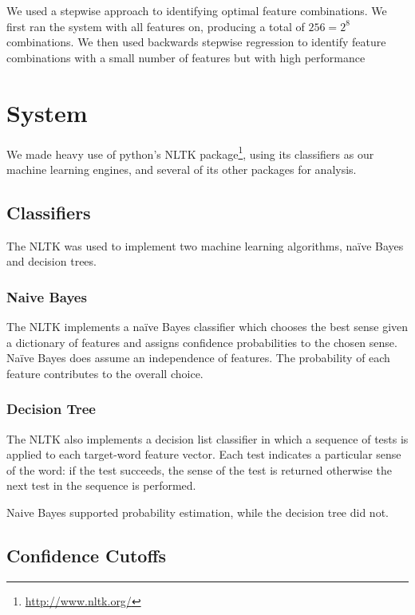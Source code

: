 \documentclass{article}
\newcommand{\naive}{na\"ive}
\newcommand{\Naive}{Na\"ive}
\begin{document}
We used a \ward stepwise approach to identifying optimal feature combinations.
We first ran the system with all features on, producing a total of $256=2^8$
combinations.  We then used backwards stepwise regression to identify feature
combinations with a small number of features but with high performance

\section{System}

We made heavy use of python's NLTK
package\footnote{\url{http://www.nltk.org/}}, using its classifiers as our
machine learning engines, and several of its other packages for analysis.

\subsection{Classifiers}

The NLTK was used to implement two machine learning algorithms, \naive{} Bayes and
decision trees.  

\subsubsection{Naive Bayes}

The NLTK implements a \naive{} Bayes classifier which chooses the best sense given a
dictionary of features and assigns confidence probabilities to the chosen
sense. \Naive{} Bayes does assume an independence of features. The probability of
each feature contributes to the overall choice.

\subsubsection{Decision Tree}

The NLTK also implements a decision list classifier in which a sequence of
tests is applied to each target-word feature vector. Each test indicates a
particular sense of the word: if the test succeeds, the sense of the test is
returned otherwise the next test in the sequence is performed.

Naive Bayes supported probability estimation, while the decision tree did not.

\subsection{Confidence Cutoffs}
\end{document}
